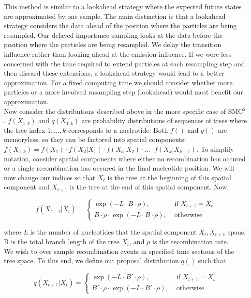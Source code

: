 \documentclass{article}
\begin{document}
\noindent This method is similar to a lookahead strategy where the expected future states
are approximated by one sample. The main distinction is that a lookahead
strategy considers the data ahead of the position where the particles are being resampled.
Our delayed importance sampling looks at the data before the position where the
particles are being resampled. We delay the transition influence rather than looking
ahead at the emission influence. If we were less concerned with the time required
to extend particles at each resampling step and then discard these extensions,
a lookahead strategy would lead to a better approximation. For a fixed computing time
we should consider whether more particles or a more involved rasampling step (lookahead)
would most benefit our approximation. \\

\noindent Now consider the distributions described above in the more specific case of SMC$^2$. 
$f(X_{1:k})$ and $q(X_{1:k})$ are
probability distributions of sequences of trees where the tree index $1,...,k$ corresponds to a nucleotide. 
Both $f()$ and $q()$ are memoryless, so they can be factored into spatial components:
$f(X_{1:k})=f(X_1) \cdot f(X_2|X_1) \cdot f(X_3|X_2) \cdot \ldots \cdot f(X_k|X_{k-1})$.
To simplify notation, consider spatial components where either no recombination has occured or
a single recombination has occured in the final nucleotide position. We will now change our indices
so that $X_t$ is the tree at the beginning of this spatial component and $X_{t+1}$ is the tree
at the end of this spatial component. Now,

\begin{equation}
 f(X_{t+1}|X_{t}) = \begin{cases}
  \exp(- L \cdot B \cdot \rho), & \text{ if } X_{t+1} = X_{t} \\
  B \cdot \rho \cdot \exp(- L \cdot B \cdot \rho), & \text{ otherwise }
 \end{cases}
\end{equation}

\noindent where $L$ is the number of nucleotides that the spatial component $X_t,X_{t+1}$ spans,
B is the total branch length of the tree $X_t$, and $\rho$ is the recombination rate. \\

\noindent We wish to over sample recombination events in specified time sections of the tree space.
To this end, we define out proposal distribution $q()$ such that

\begin{equation}
 q(X_{t+1}|X_{t}) = \begin{cases}
  \exp(- L \cdot B' \cdot \rho), & \text{ if } X_{t+1} = X_{t} \\
  B' \cdot \rho \cdot \exp(- L \cdot B' \cdot \rho), & \text{ otherwise }
 \end{cases}
\end{equation}
\end{document}
